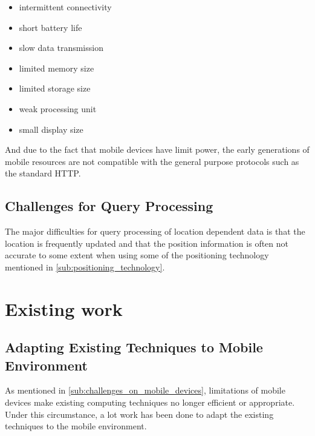 \documentclass[12pt,a4paper]{article}
\begin{document}
\begin{itemize}
	\item intermittent connectivity
	\item short battery life
	\item slow data transmission
	\item limited memory size
	\item limited storage size
	\item weak processing unit
	\item small display size
\end{itemize}

And due to the fact that mobile devices have limit power, the early generations of mobile resources are not compatible with the general purpose protocols such as the standard HTTP.

\subsection{Challenges for Query Processing} %
\label{sub:challenges_for_query_processing}
The major difficulties for query processing of location dependent data is that the location is frequently updated and that the position information is often not accurate to some extent when using some of the positioning technology mentioned in \ref{sub:positioning_technology}.


\section{Existing work} %
\label{sec:existing}

\subsection{Adapting Existing Techniques to Mobile Environment} %
\label{sub:adapting_existing_techniques_to_mobile_environment}
As mentioned in \ref{sub:challenges_on_mobile_devices}, limitations of mobile devices make existing computing techniques no longer efficient or appropriate. Under this circumstance, a lot work has been done to adapt the existing techniques to the mobile environment. \cite{imielinski1993data,imielinski1996introduction,pitoura1998data,jing1999client,ISI:000079296600012}
\end{document}
